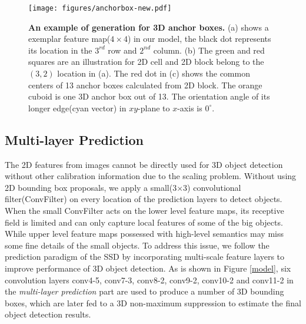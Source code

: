 \documentclass[10pt,twocolumn,letterpaper]{article}
\begin{document}
	\begin{figure}[ht]
		\centering
		\texttt{[image: figures/anchorbox-new.pdf]}
		\caption{\textbf{An example of generation for 3D anchor boxes.} (a) shows a exemplar feature map($4\times4$) in our model, the black dot represents its location in the $3^{rd}$ row and $2^{nd}$ column. (b) The green and red squares are an illustration for 2D cell and 2D block belong to the $(3,2)$ location in (a). The red dot in (c) shows the common centers of 13 anchor boxes calculated from 2D block. The orange cuboid is one 3D anchor box out of 13. The orientation angle of its longer edge(cyan vector) in $xy$-plane to $x$-axis is $0^{\circ}$.}
		\label{anchor}
		\vspace{-3mm}
	\end{figure}    
	\subsection{Multi-layer Prediction}
	The 2D features from images cannot be directly used for 3D object detection without other calibration information due to the scaling problem. %
	Without using 2D bounding box proposals, we apply a small(3$\times$3) convolutional filter(ConvFilter) on every location of the prediction layers to detect objects. When the small ConvFilter acts on the lower level feature maps, its receptive field is limited and can only capture local features of  some of the big objects. While upper level feature maps possessed with high-level semantics may miss some fine details of the small objects. To address this issue, we follow the prediction paradigm of the SSD \cite{Wei2016SSD} by incorporating multi-scale feature layers to improve performance of 3D object detection. As is shown in Figure \ref{model}, six convolution layers conv4-5, conv7-3,  conv8-2, conv9-2, conv10-2 and conv11-2 in the \emph{multi-layer prediction} part are used to produce a number of 3D bounding boxes, which are later fed to a 3D non-maximum suppression to estimate the final object detection results. \par
	
\end{document}
